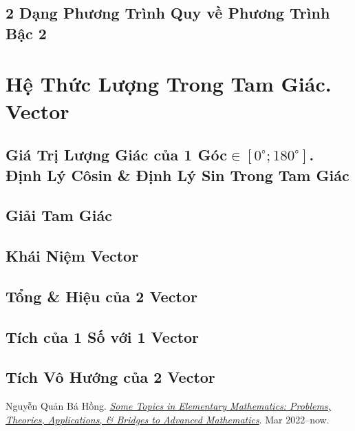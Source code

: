 \documentclass[oneside]{book}
\numberwithin{equation}{section}
\begin{document}
\section{2 Dạng Phương Trình Quy về Phương Trình Bậc 2}


\chapter{Hệ Thức Lượng Trong Tam Giác. Vector}

\section{Giá Trị Lượng Giác của 1 Góc$\in[0^\circ;180^\circ]$. Định Lý Côsin \& Định Lý Sin Trong Tam Giác}

\section{Giải Tam Giác}

\section{Khái Niệm Vector}

\section{Tổng \& Hiệu của 2 Vector}

\section{Tích của 1 Số với 1 Vector}

\section{Tích Vô Hướng của 2 Vector}


\begin{thebibliography}{99}
	 Nguyễn Quản Bá Hồng. \href{https://github.com/NQBH/hobby/blob/master/elementary_mathematics/some_topics_in_elementary_mathematics_problems_theories_applications_bridges_to_advanced_mathematics/NQBH_some_topics_in_elementary_mathematics_problems_theories_applications_bridges_to_advanced_mathematics.pdf}{\textit{Some Topics in Elementary Mathematics: Problems, Theories, Applications, \& Bridges to Advanced Mathematics}}. Mar 2022--now.
\end{thebibliography}


\printbibliography[heading=bibintoc]
\end{document}
